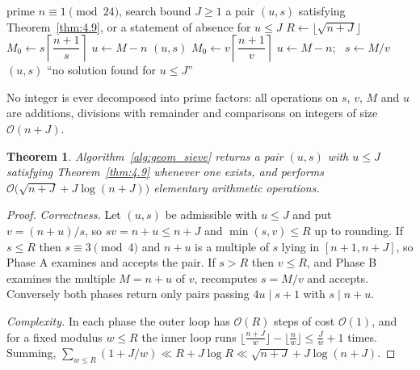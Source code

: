 \documentclass[11pt, a4paper]{article}
\theoremstyle{plain}
\newtheorem{theorem}{Theorem}[section]
\theoremstyle{definition}
\begin{document}
\begin{algorithm}[H]
\caption{Two-phase geometric segmented sieve, bound $J$} \label{alg:geom_sieve}
\begin{algorithmic}[1]
\Require prime $n \equiv 1 \pmod{24}$, search bound $J \ge 1$
\Ensure a pair $(u, s)$ satisfying Theorem~\ref{thm:4.9}, or a statement of absence for $u \le J$
\State $R\gets\lfloor\sqrt{n+J}\rfloor$
    \State $M_0 \gets s\left\lceil \dfrac{n+1}{s}\right\rceil$ 
        \State $u \gets M-n$
            \State \Return $(u, s)$
        \EndIf
    \EndFor
\EndFor
{}
    \State $M_0 \gets v\left\lceil \dfrac{n+1}{v}\right\rceil$
        \State $u \gets M-n$; \ $s \gets M/v$
            \State \Return $(u, s)$
        \EndIf
    \EndFor
\EndFor
\State \Return \textsf{``no solution found for } $u \le J$\textsf{''}
\end{algorithmic}
\end{algorithm}

No integer is ever decomposed into prime factors: all operations on $s$, $v$, $M$ and $u$ are additions, divisions with remainder and comparisons on integers of size $\mathcal{O}(n+J)$.

\begin{theorem} \label{thm:4.11}
Algorithm~\ref{alg:geom_sieve} returns a pair $(u,s)$ with $u\le J$ satisfying Theorem~\ref{thm:4.9} whenever one exists, and performs $\mathcal{O}\big(\sqrt{n+J}+J\log(n+J)\big)$ elementary arithmetic operations.
\end{theorem}
\begin{proof}
\emph{Correctness.} Let $(u,s)$ be admissible with $u\le J$ and put $v=(n+u)/s$, so $sv=n+u\le n+J$ and $\min(s,v)\le R$ up to rounding. If $s\le R$ then $s\equiv3\pmod4$ and $n+u$ is a multiple of $s$ lying in $[n+1,n+J]$, so Phase A examines and accepts the pair. If $s>R$ then $v\le R$, and Phase B examines the multiple $M=n+u$ of $v$, recomputes $s=M/v$ and accepts. Conversely both phases return only pairs passing $4u\mid s+1$ with $s\mid n+u$.

\emph{Complexity.} In each phase the outer loop has $\mathcal{O}(R)$ steps of cost $\mathcal{O}(1)$, and for a fixed modulus $w\le R$ the inner loop runs $\lfloor\frac{n+J}{w}\rfloor-\lfloor\frac{n}{w}\rfloor\le\frac{J}{w}+1$ times. Summing, $\sum_{w\le R}(1+J/w)\ll R+J\log R\ll\sqrt{n+J}+J\log(n+J)$.
\end{proof}
\end{document}

